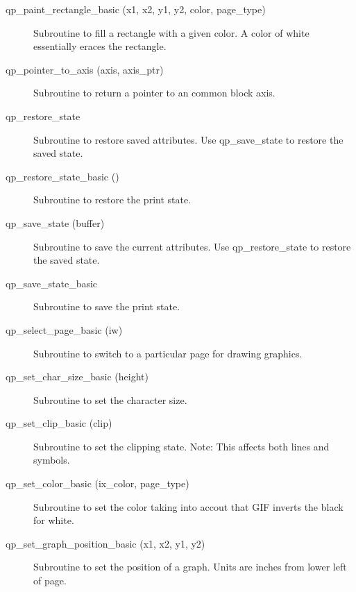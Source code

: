 \begin{description}
\item[qp_paint_rectangle_basic (x1, x2, y1, y2, color, page_type)] \Newline 
Subroutine to fill a rectangle with a given color. 
A color of white essentially eraces the rectangle.

\item[qp_pointer_to_axis (axis, axis_ptr)] \Newline 
Subroutine to return a pointer to an common block axis.

\item[qp_restore_state] \Newline 
     Subroutine to restore saved attributes. 
     Use qp_save_state to restore the saved state.

\item[qp_restore_state_basic ()] \Newline 
Subroutine to restore the print state.

\item[qp_save_state (buffer)] \Newline 
     Subroutine to save the current attributes. 
     Use qp_restore_state to restore the saved state.

\item[qp_save_state_basic ] \Newline 
Subroutine to save the print state.

\item[qp_select_page_basic (iw)] \Newline 
Subroutine to switch to a particular page for drawing graphics.

\item[qp_set_char_size_basic (height)] \Newline 
Subroutine to set the character size.

\item[qp_set_clip_basic (clip)] \Newline 
Subroutine to set the clipping state.
Note: This affects both lines and symbols.

\item[qp_set_color_basic (ix_color, page_type)  ] \Newline 
Subroutine to set the color taking into accout that GIF
inverts the black for white.

\item[qp_set_graph_position_basic (x1, x2, y1, y2)] \Newline 
Subroutine to set the position of a graph.
Units are inches from lower left of page.


\end{description}
